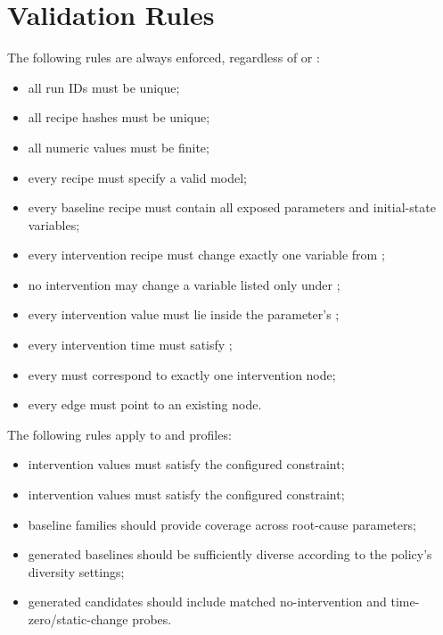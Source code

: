 \documentclass[11pt]{article}
\begin{document}
\section*{Validation Rules}

The following rules are always enforced, regardless of  or :

\begin{itemize}
    \item all run IDs must be unique;
    \item all recipe hashes must be unique;
    \item all numeric values must be finite;
    \item every recipe must specify a valid model;
    \item every baseline recipe must contain all exposed parameters and initial-state variables;
    \item every intervention recipe must change exactly one variable from ;
    \item no intervention may change a variable listed only under ;
    \item every intervention value must lie inside the parameter's ;
    \item every intervention time must satisfy ;
    \item every  must correspond to exactly one intervention node;
    \item every edge must point to an existing node.
\end{itemize}

The following rules apply to  and  profiles:

\begin{itemize}
    \item intervention values must satisfy the configured \termMinAbsDist{} constraint;
    \item intervention values must satisfy the configured \termMinSRDDistance{} constraint;
    \item baseline families should provide coverage across root-cause parameters;
    \item generated baselines should be sufficiently diverse according to the policy's diversity settings;
    \item generated candidates should include matched no-intervention and time-zero/static-change probes.
\end{itemize}
\end{document}
